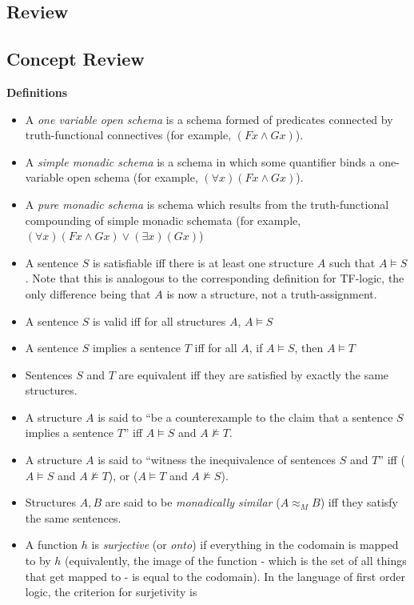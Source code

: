 \subsection{Review}
\begin{mdframed}[linewidth=1]
\section*{Concept Review}
\textbf{Definitions}
\begin{itemize}
    \item A \emph{one variable open schema} is a schema formed of predicates connected by truth-functional connectives (for example, $(Fx \land Gx)$). 
    \item A \emph{simple monadic schema} is a schema in which some quantifier binds a one-variable open schema (for example, $(\forall x)(Fx \land Gx)$). 
    \item A \emph{pure monadic schema} is schema which results from the truth-functional compounding of simple monadic schemata (for example, $(\forall x)(Fx \land Gx) \vee (\exists x)(Gx)$)
    \item A sentence $S$ is satisfiable iff there is at least one structure $A$ such that $A \models S$. Note that this is analogous to the corresponding definition for TF-logic, the only difference being that $A$ is now a structure, not a truth-assignment. 
    \item A sentence $S$ is valid iff for all structures $A$, $A \models S$
    \item A sentence $S$ implies a sentence $T$ iff for all $A$, if $A \models S$, then $A \models T$
    \item Sentences $S$ and $T$ are equivalent iff they are satisfied by exactly the same structures. 
    \item A structure $A$ is said to ``be a counterexample to the claim that a sentence $S$ implies a sentence $T$'' iff $A \models S$ and $A \not \models T$. 
    \item A structure $A$ is said to ``witness the inequivalence of sentences $S$ and $T$'' iff ($A \models S$ and $A \not \models T$), or ($A \models T$ and $A \not \models S$). 
    \item Structures $A, B$ are said to be \emph{monadically similar} ($A \approx_M B$) iff they satisfy the same sentences. 
    \item A function $h$ is \emph{surjective} (or \emph{onto})  if everything in the codomain is mapped to by $h$ (equivalently, the image of the function - which is the set of all things that get mapped to - is equal to the codomain). In the language of first order logic, the criterion for surjetivity is

\end{itemize}
\end{mdframed}
